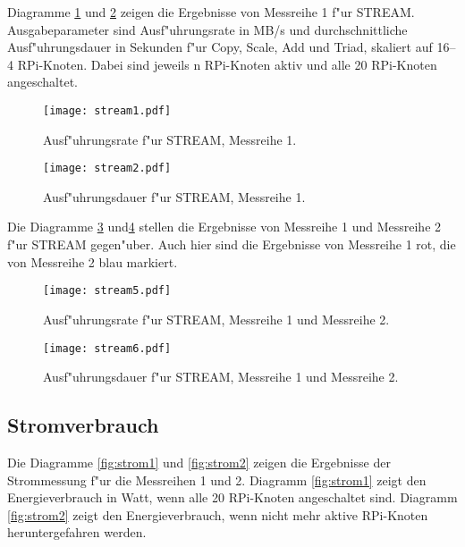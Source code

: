 Diagramme \ref{fig:stream1} und \ref{fig:stream2} zeigen die Ergebnisse von Messreihe 1 f"ur STREAM. Ausgabeparameter sind Ausf"uhrungsrate in MB/s und durchschnittliche Ausf"uhrungsdauer in Sekunden f"ur Copy, Scale, Add und Triad, skaliert auf 16--4 RPi-Knoten. Dabei sind jeweils n RPi-Knoten aktiv und alle 20 RPi-Knoten angeschaltet.  
\begin{figure}[htb]
  \centering
  \texttt{[image: stream1.pdf]}\\ 
  \caption{Ausf"uhrungsrate f"ur STREAM, Messreihe 1.}
  \label{fig:stream1}		
\end{figure}
\begin{figure}[htb]
  \centering
  \texttt{[image: stream2.pdf]}\\ 
  \caption{Ausf"uhrungsdauer f"ur STREAM, Messreihe 1.}
  \label{fig:stream2}		
\end{figure}
\noindent
Die Diagramme \ref{fig:stream5} und\ref{fig:stream6} stellen die Ergebnisse von Messreihe 1 und Messreihe 2 f"ur STREAM gegen"uber. Auch hier sind die Ergebnisse von Messreihe 1 rot, die von Messreihe 2 blau markiert. 
\begin{figure}[htb]
  \centering
  \texttt{[image: stream5.pdf]}\\ 
  \caption{Ausf"uhrungsrate f"ur STREAM, Messreihe 1 und Messreihe 2.}\label{fig:stream5}
\end{figure}
\begin{figure}[htb]
  \centering
  \texttt{[image: stream6.pdf]}\\ 
  \caption{Ausf"uhrungsdauer f"ur STREAM, Messreihe 1 und Messreihe 2.}\label{fig:stream6}
\end{figure}
\subsection{Stromverbrauch}\label{Ergebnisse-Energenie}

Die Diagramme \ref{fig:strom1} und \ref{fig:strom2} zeigen die Ergebnisse der Strommessung f"ur die Messreihen 1 und 2. Diagramm \ref{fig:strom1} zeigt den Energieverbrauch in Watt, wenn alle 20 RPi-Knoten angeschaltet sind. Diagramm \ref{fig:strom2} zeigt den Energieverbrauch, wenn nicht mehr aktive RPi-Knoten heruntergefahren werden. 
\endinput 


